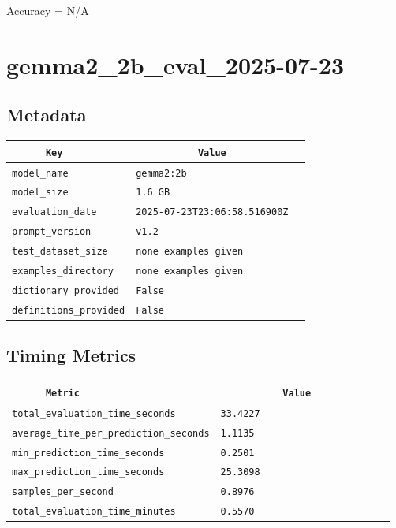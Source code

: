 \documentclass{article}
\begin{document}
\begin{center}
Accuracy = N/A
\end{center}

\section{gemma2\_2b\_eval\_2025-07-23}
\subsection{Metadata}

\begin{center}
\begin{tabular}{l | l} \hline
    \verb|      Key      | & \verb|           Value           | \\ \hline
    \hline
    \verb|model_name    | & \verb|gemma2:2b                    | \\ \hline
    \verb|model_size    | & \verb|1.6 GB                       | \\ \hline
    \verb|evaluation_date| & \verb|2025-07-23T23:06:58.516900Z  | \\ \hline
    \verb|prompt_version| & \verb|v1.2                         | \\ \hline
    \verb|test_dataset_size| & \verb|none examples given          | \\ \hline
    \verb|examples_directory| & \verb|none examples given          | \\ \hline
    \verb|dictionary_provided| & \verb|False                        | \\ \hline
    \verb|definitions_provided| & \verb|False                        | \\ \hline
\end{tabular}
\end{center}

\subsection{Timing Metrics}

\begin{center}
\begin{tabular}{l | l} \hline
    \verb|      Metric     | & \verb|           Value           | \\ \hline
    \hline
    \verb|total_evaluation_time_seconds| & \verb|33.4227                      | \\ \hline
    \verb|average_time_per_prediction_seconds| & \verb|1.1135                       | \\ \hline
    \verb|min_prediction_time_seconds| & \verb|0.2501                       | \\ \hline
    \verb|max_prediction_time_seconds| & \verb|25.3098                      | \\ \hline
    \verb|samples_per_second| & \verb|0.8976                       | \\ \hline
    \verb|total_evaluation_time_minutes| & \verb|0.5570                       | \\ \hline
\end{tabular}
\end{center}
\end{document}
